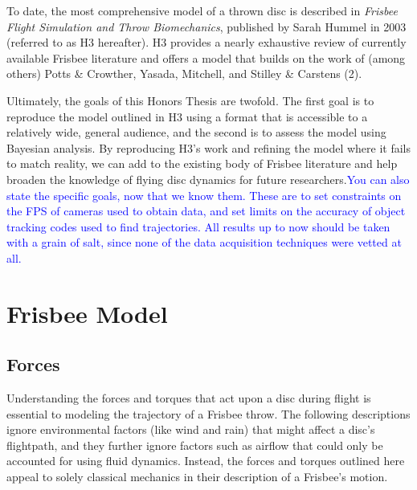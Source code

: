 \documentclass[a4paper,12pt, oneside]{article}
\newcommand{\blue}[1]{\textcolor{blue}{#1}}
\begin{document}
To date, the most comprehensive model of a thrown disc is described in \textit{Frisbee Flight Simulation and Throw Biomechanics}, published by Sarah Hummel in 2003 (referred to as H3 hereafter). H3 provides a nearly exhaustive review of currently available Frisbee literature and offers a model that builds on the work of (among others) Potts \& Crowther, Yasada, Mitchell, and Stilley \& Carstens (2). 

Ultimately, the goals of this Honors Thesis are twofold. The first goal is to reproduce the model outlined in H3 using a format that is accessible to a relatively wide, general audience, and the second is to assess the model using Bayesian analysis. By reproducing H3's work and refining the model where it fails to match reality, we can add to the existing body of Frisbee literature and help broaden the knowledge of flying disc dynamics for future researchers.\blue{You can also state the specific goals, now that we know them. These are to set constraints on the FPS of cameras used to obtain data, and set limits on the accuracy of object tracking codes used to find trajectories. All results up to now should be taken with a grain of salt, since none of the data acquisition techniques were vetted at all.}

\section{Frisbee Model}

\subsection{Forces}
Understanding the forces and torques that act upon a disc during flight is essential to modeling the trajectory of a Frisbee throw. The following descriptions ignore environmental factors (like wind and rain) that might affect a disc's flightpath, and they further ignore factors such as airflow that could only be accounted for using fluid dynamics. Instead, the forces and torques outlined here appeal to solely classical mechanics in their description of a Frisbee's motion.
\end{document}
